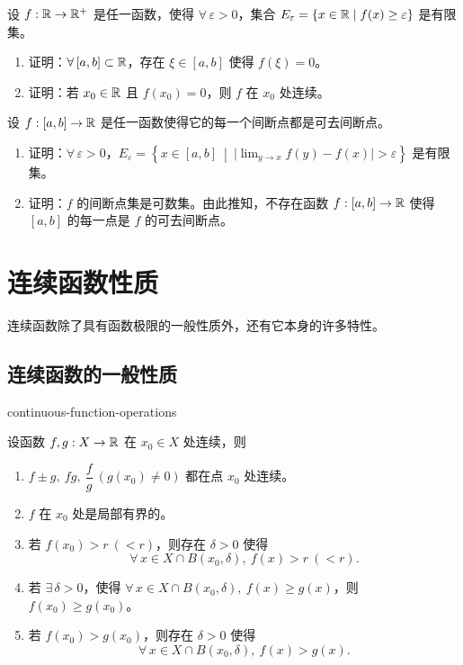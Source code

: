 \begin{exercise}
	\item 设 \(f:\mathbb{R}\to\mathbb{R}^+\) 是任一函数，使得 \(\forall\,\varepsilon>0\)，集合 \(E_\varepsilon=\{x\in\mathbb{R}\mid f(x)\ge\varepsilon\}\) 是有限集。
	\begin{enumerate}[label=\arabic*)]
		\item 证明：\(\forall\,[a,b]\subset\mathbb{R}\)，存在 \(\xi\in[a,b]\) 使得 \(f(\xi)=0\)。
		\item 证明：若 \(x_0\in\mathbb{R}\) 且 \(f(x_0)=0\)，则 \(f\) 在 \(x_0\) 处连续。
	\end{enumerate}
\end{exercise}

\begin{exercise}
	\item 设 \(f:[a,b]\to\mathbb{R}\) 是任一函数使得它的每一个间断点都是可去间断点。
	\begin{enumerate}[label=\arabic*)]
		\item 证明：\(\forall\,\varepsilon>0\)，\(E_\varepsilon=\left\{x\in[a,b]\ \middle|\ \bigl|\lim_{y\to x}f(y)-f(x)\bigr|>\varepsilon\right\}\) 是有限集。
		\item 证明：\(f\) 的间断点集是可数集。由此推知，不存在函数 \(f:[a,b]\to\mathbb{R}\) 使得 \([a,b]\) 的每一点是 \(f\) 的可去间断点。
	\end{enumerate}
\end{exercise}

\section{连续函数性质}

连续函数除了具有函数极限的一般性质外，还有它本身的许多特性。

\subsection{连续函数的一般性质}

\begin{mythm}{}{continuous-function-operations}

	设函数 \(f,g:X\to\mathbb{R}\) 在 \(x_0\in X\) 处连续，则

	\begin{enumerate}[label=\arabic*)]
		\item \(f\pm g,\ fg,\ \dfrac fg\ (g(x_0)\neq0)\) 都在点 \(x_0\) 处连续。

		\item \(f\) 在 \(x_0\) 处是局部有界的。

		\item 若 \(f(x_0)>r\ (<r)\)，则存在 \(\delta>0\) 使得
		\[
		\forall\,x\in X\cap B(x_0,\delta),\ f(x)>r\ (<r).
		\]

		\item 若 \(\exists\,\delta>0\)，使得 \(\forall\,x\in X\cap B(x_0,\delta),\ f(x)\ge g(x)\)，则 \(f(x_0)\ge g(x_0)\)。

		\item 若 \(f(x_0)>g(x_0)\)，则存在 \(\delta>0\) 使得
		\[
		\forall\,x\in X\cap B(x_0,\delta),\ f(x)>g(x).
		\]
	\end{enumerate}

\end{mythm}

